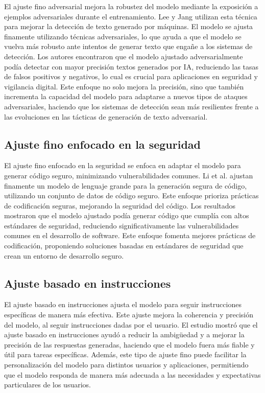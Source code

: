 El ajuste fino adversarial mejora la robustez del modelo mediante la exposición a ejemplos adversariales durante el entrenamiento. Lee y Jang \cite{Lee2024} utilizan esta técnica para mejorar la detección de texto generado por máquinas. El modelo se ajusta finamente utilizando técnicas adversariales, lo que ayuda a que el modelo se vuelva más robusto ante intentos de generar texto que engañe a los sistemas de detección. Los autores encontraron que el modelo ajustado adversarialmente podía detectar con mayor precisión textos generados por IA, reduciendo las tasas de falsos positivos y negativos, lo cual es crucial para aplicaciones en seguridad y vigilancia digital. Este enfoque no solo mejora la precisión, sino que también incrementa la capacidad del modelo para adaptarse a nuevos tipos de ataques adversariales, haciendo que los sistemas de detección sean más resilientes frente a las evoluciones en las tácticas de generación de texto adversarial.

\subsection{Ajuste fino enfocado en la seguridad}

El ajuste fino enfocado en la seguridad se enfoca en adaptar el modelo para generar código seguro, minimizando vulnerabilidades comunes. Li et al. \cite{JLi2024}  ajustan finamente un modelo de lenguaje grande para la generación segura de código, utilizando un conjunto de datos de código seguro. Este enfoque prioriza prácticas de codificación seguras, mejorando la seguridad del código. Los resultados mostraron que el modelo ajustado podía generar código que cumplía con altos estándares de seguridad, reduciendo significativamente las vulnerabilidades comunes en el desarrollo de software. Este enfoque fomenta mejores prácticas de codificación, proponiendo soluciones basadas en estándares de seguridad que crean un entorno de desarrollo seguro.

\subsection{Ajuste basado en instrucciones}

El ajuste basado en instrucciones \cite{Liesenfeld2023} ajusta el modelo para seguir instrucciones específicas de manera más efectiva. Este ajuste mejora la coherencia y precisión del modelo, al seguir instrucciones dadas por el usuario. El estudio mostró que el ajuste basado en instrucciones ayudó a reducir la ambigüedad y a mejorar la precisión de las respuestas generadas, haciendo que el modelo fuera más fiable y útil para tareas específicas. Además, este tipo de ajuste fino puede facilitar la personalización del modelo para distintos usuarios y aplicaciones, permitiendo que el modelo responda de manera más adecuada a las necesidades y expectativas particulares de los usuarios.

